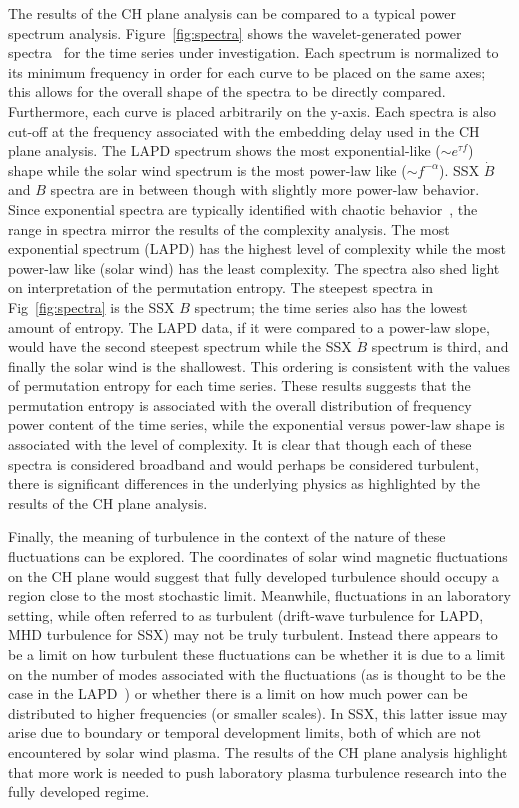 \documentclass[aps,pre,twocolumn,secnumarabic,nobalancelastpage,amsmath,amssymb,
nofootinbib]{revtex4-1}
\begin{document}
The results of the CH plane analysis can be compared to a typical power spectrum analysis. Figure~\ref{fig:spectra} shows the wavelet-generated power spectra~\cite{torrence1998} for the time series under investigation. Each spectrum is normalized to its minimum frequency in order for each curve to be placed on the same axes; this allows for the overall shape of the spectra to be directly compared. Furthermore, each curve is placed arbitrarily on the y-axis. Each spectra is also cut-off at the frequency associated with the embedding delay used in the CH plane analysis. The LAPD spectrum shows the most exponential-like ($\sim e^{\tau f}$) shape while the solar wind spectrum is the most power-law like ($\sim f^{-\alpha}$). SSX $\dot{B}$ and $B$ spectra are in between though with slightly more power-law behavior. Since exponential spectra are typically identified with chaotic behavior~\cite{maggs2012}, the range in spectra mirror the results of the complexity analysis. The most exponential spectrum (LAPD) has the highest level of complexity while the most power-law like (solar wind) has the least complexity. The spectra also shed light on interpretation of the permutation entropy. The steepest spectra in Fig~\ref{fig:spectra} is the SSX $B$ spectrum; the time series also has the lowest amount of entropy. The LAPD data, if it were compared to a power-law slope, would have the second steepest spectrum while the SSX $\dot{B}$ spectrum is third, and finally the solar wind is the shallowest. This ordering is consistent with the values of permutation entropy for each time series. These results suggests that the permutation entropy is associated with the overall distribution of frequency power content of the time series, while the exponential versus power-law shape is associated with the level of complexity. It is clear that though each of these spectra is considered broadband and would perhaps be considered turbulent, there is significant differences in the underlying physics as highlighted by the results of the CH plane analysis.

Finally, the meaning of turbulence in the context of the nature of these fluctuations can be explored. The coordinates of solar wind magnetic fluctuations on the CH plane would suggest that fully developed turbulence should occupy a region close to the most stochastic limit. Meanwhile, fluctuations in an laboratory setting, while often referred to as turbulent (drift-wave turbulence for LAPD, MHD turbulence for SSX) may not be truly turbulent. Instead there appears to be a limit on how turbulent these fluctuations can be whether it is due to a limit on the number of modes associated with the fluctuations (as is thought to be the case in the LAPD~\cite{maggs2013}) or whether there is a limit on how much power can be distributed to higher frequencies (or smaller scales). In SSX, this latter issue may arise due to boundary or temporal development limits, both of which are not encountered by solar wind plasma. The results of the CH plane analysis highlight that more work is needed to push laboratory plasma turbulence research into the fully developed regime.
 
\end{document}
